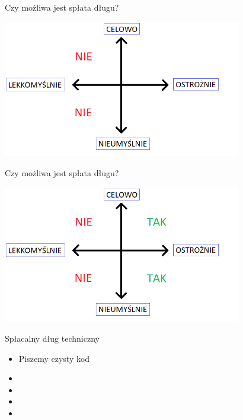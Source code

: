 \documentclass{beamer}
\begin{document}
\begin{frame}{Czy możliwa jest spłata długu{?}}
\begin{center}
  	\includegraphics[height=6cm]{splata_dlugu2.png}
\end{center}
\end{frame}

\begin{frame}{Czy możliwa jest spłata długu{?}}
\begin{center}
  	\includegraphics[height=6cm]{splata_dlugu3.png}
\end{center}
\end{frame}

\begin{frame}{Spłacalny dług techniczny}
     \begin{Large}
	\begin{itemize}
		\item Piszemy czysty kod
		\item 
		\item 
		\item 
		\item 
	\end{itemize}
     \end{Large}
\end{frame}
\end{document}
